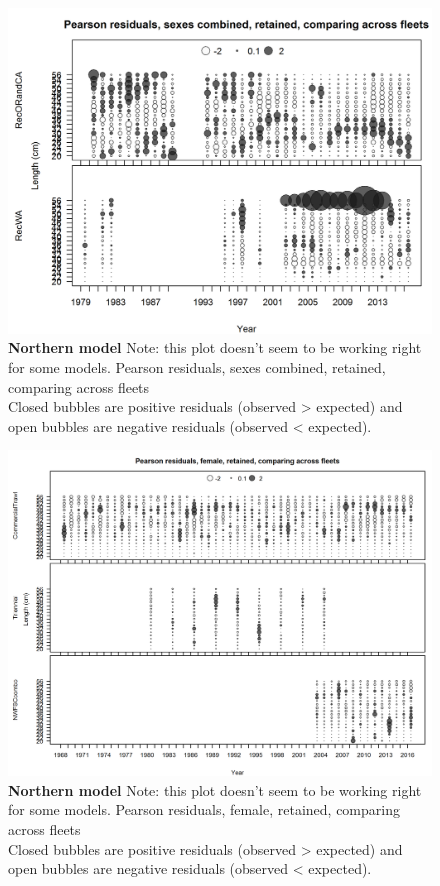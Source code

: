 \documentclass[12pt,]{article}
\begin{document}
\begin{figure}[htbp]
\centering
\includegraphics{./r4ss/plots_mod1/comp_lenfit_sex1mkt2_multi-fleet_comparison.png}
\caption{\textbf{Northern model} Note: this plot doesn't seem to be
working right for some models. Pearson residuals, sexes combined,
retained, comparing across fleets\\
Closed bubbles are positive residuals (observed \textgreater{} expected)
and open bubbles are negative residuals (observed \textless{} expected).
\label{fig:mod1_32_comp_lenfit_sex1mkt2_multi-fleet_comparison}}
\end{figure}

\begin{figure}[htbp]
\centering
\includegraphics{./r4ss/plots_mod1/comp_lenfit_sex2mkt2_multi-fleet_comparison.png}
\caption{\textbf{Northern model} Note: this plot doesn't seem to be
working right for some models. Pearson residuals, female, retained,
comparing across fleets\\
Closed bubbles are positive residuals (observed \textgreater{} expected)
and open bubbles are negative residuals (observed \textless{} expected).
\label{fig:mod1_33_comp_lenfit_sex2mkt2_multi-fleet_comparison}}
\end{figure}
\end{document}
